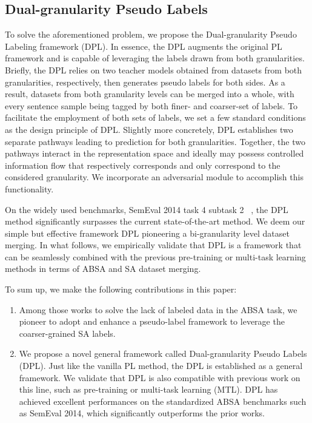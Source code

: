 \documentclass[11pt]{article}
\begin{document}
\subsection{Dual-granularity Pseudo Labels}
To solve the aforementioned problem, we propose the Dual-granularity Pseudo Labeling framework (DPL). 
In essence, the DPL augments the original PL framework and is capable of leveraging the labels drawn from both granularities.
Briefly, the DPL relies on two teacher models obtained from datasets from both granularities, respectively, then generates pseudo labels for both sides. 
As a result, datasets from both granularity levels can be merged into a whole, with every sentence sample being tagged by both finer- and coarser-set of labels. 
To facilitate the employment of both sets of labels, we set a few standard conditions as the design principle of DPL. Slightly more concretely, DPL establishes two separate pathways leading to prediction for both granularities. Together, the two pathways interact in the representation space and ideally may possess controlled information flow that respectively corresponds and only correspond to the considered granularity.
We incorporate an adversarial module to accomplish this functionality.





On the widely used benchmarks, SemEval 2014 task 4 subtask 2 ~\cite{pontikisemeval}, the DPL method significantly surpasses the current state-of-the-art method. We deem our simple but effective framework DPL pioneering a bi-granularity level dataset merging. 
In what follows, we empirically validate that DPL is a framework that can be seamlessly combined with the previous pre-training or multi-task learning methods in terms of ABSA and SA dataset merging.


To sum up, we make the following contributions in this paper:
\begin{enumerate}
    \item Among those works to solve the lack of labeled data in the ABSA task, we pioneer to adopt and enhance a pseudo-label framework to leverage the coarser-grained SA labels.
    \item We propose a novel general framework called Dual-granularity Pseudo Labels (DPL). Just like the vanilla PL method, the DPL is established as a general framework. We validate that DPL is also compatible with previous work on this line, such as pre-training or multi-task learning (MTL). DPL has achieved excellent performances on the standardized ABSA benchmarks such as SemEval 2014, which significantly outperforms the prior works.
\end{enumerate}
\end{document}
